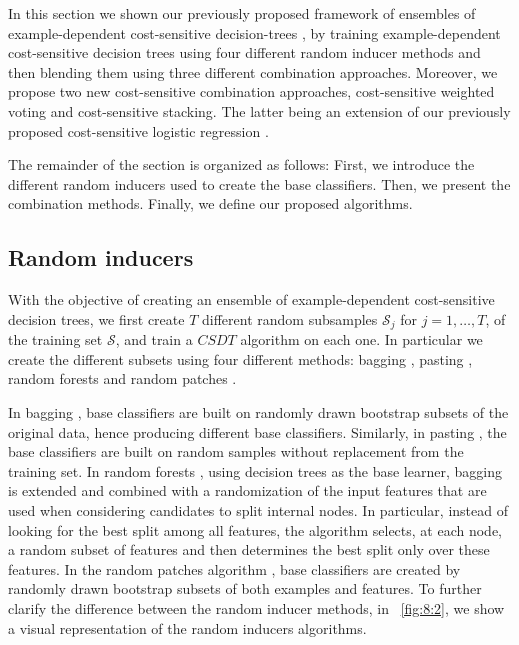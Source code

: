 {In this section we shown our previously proposed framework of ensembles of  example-dependent 
cost-sensitive  decision-trees \citep{CorreaBahnsen2015b}, by training example-dependent 
cost-sensitive decision trees using four different  random inducer methods and then blending them 
using three different combination approaches. Moreover, we propose two new cost-sensitive 
combination approaches, cost-sensitive weighted  voting and cost-sensitive stacking. The latter 
being an extension of our previously proposed cost-sensitive logistic regression 
\citep{CorreaBahnsen2014b}. 

The remainder of the section is organized as follows: First, we introduce the different random 
inducers used to create the base classifiers. Then, we present the combination methods. Finally, we 
define our proposed algorithms.


\subsection{Random inducers}

With the objective of creating an ensemble of example-dependent cost-sensitive decision trees, we 
first create $T$ different random subsamples $\mathcal{S}_j$ for $j=1,\dots,T$, of the training  set 
$\mathcal{S}$, and train a $CSDT$ algorithm on each one. In particular we create the different 
subsets using four different methods: bagging \citep{Breiman1996}, pasting \citep{Breiman1999}, 
random forests \citep{Breiman2001} and random patches \citep{Louppe2012}. 

In bagging \citep{Breiman1996}, base classifiers are built on randomly drawn bootstrap subsets of 
the original data, hence producing different base classifiers. Similarly, in pasting 
\citep{Breiman1999}, the base classifiers are built on random  samples without replacement from 
the training set. In random forests \citep{Breiman2001}, using decision trees as the base learner, 
bagging   is extended and   combined  with a  randomization of the input features that  are used 
when  considering candidates  to split    internal nodes. In particular, instead of looking for  
the best  split among all   features, the   algorithm selects, at each node, a random subset of 
features  and then determines   the best split only over  these features. In the random patches   
algorithm \citep{Louppe2012}, base classifiers are created by randomly     drawn bootstrap subsets 
of both examples and features. To further clarify the difference between the random inducer 
methods, in \figurename{~\ref{fig:8:2}}, we show a visual representation of the random inducers 
algorithms.
 
}

